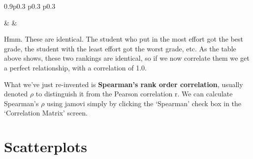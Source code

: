 \documentclass[
  a4paper,
]{book}
\begin{document}
\begin{table}[ht]
\begin{centerbox}
\begin{threeparttable}
\begin{tabularx}{0.9\textwidth}{p{} p{} p{}}
\hhline{}

 &
 &
 \tabularnewline[-0.5pt]


\end{tabularx} 

\end{threeparttable}\par\end{centerbox}

\end{table}
 

Hmm. These are identical. The student who put in the most effort got the
best grade, the student with the least effort got the worst grade, etc.
As the table above shows, these two rankings are identical, so if we now
correlate them we get a perfect relationship, with a correlation of 1.0.

What we've just re-invented is \textbf{Spearman's rank order
correlation}, usually denoted \(\rho\) to distinguish it from the
Pearson correlation r. We can calculate Spearman's \(\rho\) using jamovi
simply by clicking the `Spearman' check box in the `Correlation Matrix'
screen.

\hypertarget{scatterplots}{%
\section{Scatterplots}\label{scatterplots}}
\end{document}
